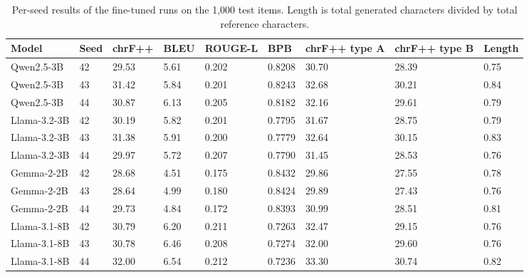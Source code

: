 \documentclass{article}
\begin{document}
\begin{table}[H]
\centering
\fontsize{8.5}{10}\selectfont
\setlength{\tabcolsep}{3pt}
\caption{Per-seed results of the fine-tuned runs on the 1,000 test items. Length is total generated characters divided by total reference characters.}\label{tab:seeds}
\begin{tabular}{@{}L{76.8pt}R{29.9pt}R{42.9pt}R{37.9pt}R{57.6pt}R{39.7pt}R{44.9pt}R{44.9pt}R{41.2pt}@{}}
\toprule
\textbf{Model} & \textbf{Seed} & \textbf{chrF++} & \textbf{BLEU} & \textbf{ROUGE-L} & \textbf{BPB} & \textbf{chrF++ type A} & \textbf{chrF++ type B} & \textbf{Length} \\
\midrule
Qwen2.5-3B & 42 & 29.53 & 5.61 & 0.202 & 0.8208 & 30.70 & 28.39 & 0.75 \\
Qwen2.5-3B & 43 & 31.42 & 5.84 & 0.201 & 0.8243 & 32.68 & 30.21 & 0.84 \\
Qwen2.5-3B & 44 & 30.87 & 6.13 & 0.205 & 0.8182 & 32.16 & 29.61 & 0.79 \\
Llama-3.2-3B & 42 & 30.19 & 5.82 & 0.201 & 0.7795 & 31.67 & 28.75 & 0.79 \\
Llama-3.2-3B & 43 & 31.38 & 5.91 & 0.200 & 0.7779 & 32.64 & 30.15 & 0.83 \\
Llama-3.2-3B & 44 & 29.97 & 5.72 & 0.207 & 0.7790 & 31.45 & 28.53 & 0.76 \\
Gemma-2-2B & 42 & 28.68 & 4.51 & 0.175 & 0.8432 & 29.86 & 27.55 & 0.78 \\
Gemma-2-2B & 43 & 28.64 & 4.99 & 0.180 & 0.8424 & 29.89 & 27.43 & 0.76 \\
Gemma-2-2B & 44 & 29.73 & 4.84 & 0.172 & 0.8393 & 30.99 & 28.51 & 0.81 \\
Llama-3.1-8B & 42 & 30.79 & 6.20 & 0.211 & 0.7263 & 32.47 & 29.15 & 0.76 \\
Llama-3.1-8B & 43 & 30.78 & 6.46 & 0.208 & 0.7274 & 32.00 & 29.60 & 0.76 \\
Llama-3.1-8B & 44 & 32.00 & 6.54 & 0.212 & 0.7236 & 33.30 & 30.74 & 0.82 \\
\bottomrule
\end{tabular}
\end{table}
\end{document}
